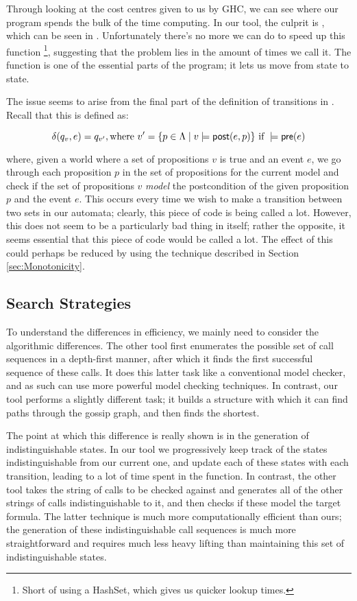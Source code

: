 \documentclass[10pt, a4paper]{report}
\begin{document}
Through looking at the cost centres given to us by GHC, we can see where our
program spends the bulk of the time computing. In our tool, the culprit is
, which can be seen in . Unfortunately
there's no more we can do to speed up this function \footnote{Short of using a
  HashSet, which gives us quicker lookup times.}, suggesting that the problem
lies in the amount of times we call it. The function is one of the essential
parts of the program; it lets us move from state to state.

The issue seems to arise from the final part of the definition of transitions in
\mestar. Recall that this is defined as:

\begin{equation} \label{eq:delta1}
  \delta(q_v, e) = q_{v'}, \text{where } v' = \{p \in \Lambda \mid v \models \textsf{post}(e, p)\}
  \text{ if } 
  \models \textsf{pre}(e)
\end{equation}

\noindent where, given a world where a set of propositions $v$ is true and an
event $e$, we go through each proposition $p$ in the set of propositions for the
current model and check if the set of propositions $v$ \emph{model} the postcondition
of the given proposition $p$ and the event $e$. This occurs every time we wish
to make a transition between two sets in our automata; clearly, this piece of
code is being called a lot. However, this does not seem to be a particularly bad
thing in itself; rather the opposite, it seems essential that this piece of code
would be called a lot. The effect of this could perhaps be reduced by using the
technique described in Section \ref{sec:Monotonicity}.

\subsection{Search Strategies}

To understand the differences in efficiency, we mainly need to consider the
algorithmic differences. The other tool first enumerates the possible set of
call sequences in a depth-first manner, after which it finds the first
successful sequence of these calls. It does this latter task like a conventional
model checker, and as such can use more powerful model checking techniques. In
contrast, our tool performs a slightly different task; it builds a structure
with which it can find paths through the gossip graph, and then finds the
shortest.

The point at which this difference is really shown is in the generation of
indistinguishable states. In our tool we progressively keep track of the states
indistinguishable from our current one, and update each of these states with
each transition, leading to a lot of time spent in the  function.
In contrast, the other tool takes the string of calls to be checked against and
generates all of the other strings of calls indistinguishable to it, and then
checks if these model the target formula. The latter technique is much more
computationally efficient than ours; the generation of these indistinguishable
call sequences is much more straightforward and requires much less heavy lifting
than maintaining this set of indistinguishable states.
\end{document}

